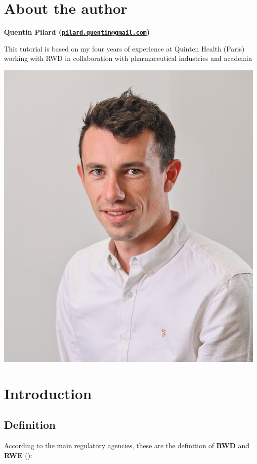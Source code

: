 \documentclass[
]{book}
\begin{document}
\chapter*{About the author}\label{author}

\textbf{Quentin Pilard
(\href{mailto:pilard.quentin@gmail.com}{\nolinkurl{pilard.quentin@gmail.com}})}

This tutorial is based on my four years of experience at Quinten Health
(Paris) working with RWD in collaboration with pharmaceutical industries
and academia

\begin{center}\includegraphics[width=0.3\linewidth]{images/moi} \end{center}

\chapter{Introduction}\label{introduction}

\section{Definition}\label{definition}

According to the main regulatory agencies, these are the definition of
\textbf{RWD} and \textbf{RWE}
():
\end{document}
